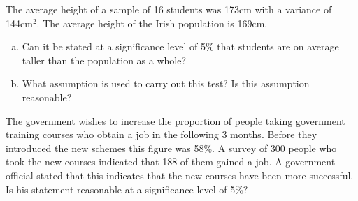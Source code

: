 

\item The average height of a sample of 16 students was 173cm with a variance of 144cm$^2$. 
The average height of the Irish population is 169cm. 
\begin{enumerate}[(a)]
\item Can it be stated at a significance level of 5\% that students are on average taller than the population as a whole? 
 \item What assumption is used to carry out this test? Is this assumption reasonable?
\end{enumerate}

\item The government wishes to increase the proportion of people taking government training courses who obtain a job in the following 3 months. Before they introduced the new schemes this figure was 58\%. A survey of 300 people who took the new courses indicated that 188 of them gained a job. A government official stated that this indicates that the new courses have been more successful. 
Is his statement reasonable at a significance level of 5\%?

